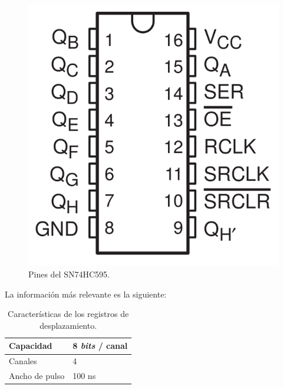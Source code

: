 \begin{figure}[H]
	\noindent \begin{centering}
		\includegraphics[width=\linewidth/4]{capitulo3/SN74HC595}
		\par\end{centering}
	\smallskip
	\caption{\label{fig:SN74HC595} Pines del SN74HC595. }
\end{figure} 

\smallskip

La información más relevante es la siguiente:

\smallskip

\begin{table}[H]
	\begin{center}
			\begin{tabular}{|l|l|}
			\hline Capacidad & 8 \textit{bits} / canal \\ 
			\hline Canales & 4 \\ 
			\hline Ancho de pulso & 100 ns \\ 
			\hline 
		\end{tabular}
		\smallskip
		\caption{\label{tab:info_regdespl} Características de los registros de desplazamiento.}
	\end{center}
\end{table}

